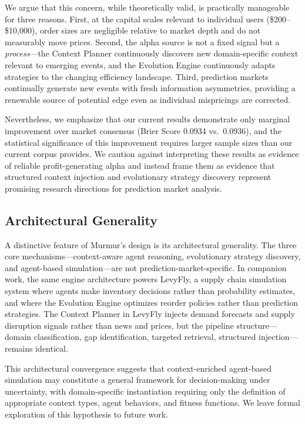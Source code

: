 We argue that this concern, while theoretically valid, is practically manageable for three reasons. First, at the capital scales relevant to individual users (\$200--\$10{,}000), order sizes are negligible relative to market depth and do not measurably move prices. Second, the alpha source is not a fixed signal but a \emph{process}---the Context Planner continuously discovers new domain-specific context relevant to emerging events, and the Evolution Engine continuously adapts strategies to the changing efficiency landscape. Third, prediction markets continually generate new events with fresh information asymmetries, providing a renewable source of potential edge even as individual mispricings are corrected.

Nevertheless, we emphasize that our current results demonstrate only marginal improvement over market consensus (Brier Score 0.0934 vs.\ 0.0936), and the statistical significance of this improvement requires larger sample sizes than our current corpus provides. We caution against interpreting these results as evidence of reliable profit-generating alpha and instead frame them as evidence that structured context injection and evolutionary strategy discovery represent promising research directions for prediction market analysis.

\subsection{Architectural Generality}

A distinctive feature of Murmur's design is its architectural generality. The three core mechanisms---context-aware agent reasoning, evolutionary strategy discovery, and agent-based simulation---are not prediction-market-specific. In companion work, the same engine architecture powers LevyFly, a supply chain simulation system where agents make inventory decisions rather than probability estimates, and where the Evolution Engine optimizes reorder policies rather than prediction strategies. The Context Planner in LevyFly injects demand forecasts and supply disruption signals rather than news and prices, but the pipeline structure---domain classification, gap identification, targeted retrieval, structured injection---remains identical.

This architectural convergence suggests that context-enriched agent-based simulation may constitute a general framework for decision-making under uncertainty, with domain-specific instantiation requiring only the definition of appropriate context types, agent behaviors, and fitness functions. We leave formal exploration of this hypothesis to future work.


